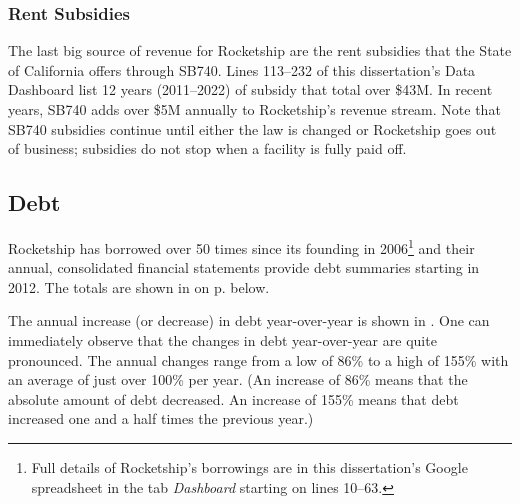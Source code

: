 \subsubsection{Rent Subsidies}%
\label{sec:rent-subsidies}\indent%

The last big source of revenue for Rocketship are the rent subsidies that the State of California offers through SB740. Lines 113–232 of this dissertation's Data Dashboard list 12 years (2011–2022) of subsidy that total over \$43M. In recent years, SB740 adds over \$5M annually to Rocketship's revenue stream. Note that SB740 subsidies continue until either the law is changed or Rocketship goes out of business; subsidies do not stop when a facility is fully paid off.

\subsection{Debt}%
\label{sec:debt}\indent%

Rocketship has borrowed over 50 times since its founding in 2006\footnote{Full details of Rocketship's borrowings are in this dissertation's Google spreadsheet in the tab \textit{Dashboard} starting on lines 10–63.} and their annual, consolidated financial statements provide debt summaries starting in 2012. The totals are shown in  on p.\pageref{tab:total_debt} below.

The annual increase (or decrease) in debt year-over-year is shown in . One can immediately observe that the changes in debt year-over-year are quite pronounced. The annual changes range from a low of 86\% to a high of 155\% with an average of just over 100\% per year. (An increase of 86\% means that the absolute amount of debt decreased. An increase of 155\% means that debt increased one and a half times the previous year.)

